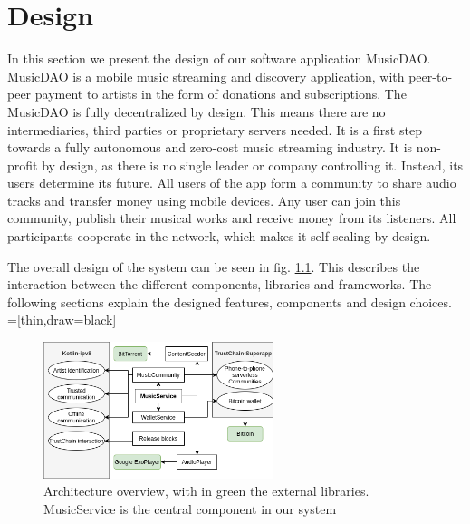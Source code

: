 \chapter{Design}
In this section we present the design of our software application MusicDAO. MusicDAO is a mobile music streaming and discovery application, with peer-to-peer payment to artists in the form of donations and subscriptions. The MusicDAO is fully decentralized by design. This means there are no intermediaries, third parties or proprietary servers needed. It is a first step towards a fully autonomous and zero-cost music streaming industry. It is non-profit by design, as there is no single leader or company controlling it. Instead, its users determine its future. All users of the app form a community to share audio tracks and transfer money using mobile devices. Any user can join this community, publish their musical works and receive money from its listeners. All participants cooperate in the network, which makes it self-scaling by design.

The overall design of the system can be seen in fig. \ref{fig:architecture}. This describes the interaction between the different components, libraries and frameworks. The following sections explain the designed features, components and design choices.
\\

=[thin,draw=black]

\begin{figure}
    \centering
    \includegraphics[width=0.6\textwidth]{design/architecture-v1.png}
    \caption{Architecture overview, with in green the external libraries. MusicService is the central component in our system}
    \label{fig:architecture}
\end{figure}

